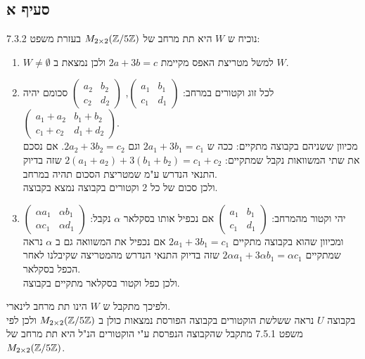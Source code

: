 \documentclass{article}
\begin{document}
	\subsection*{סעיף א}
	נוכיח ש $W$ היא תת מרחב של $M_{2 \times 2}(\mathbb{Z}/5\mathbb{Z})$ בעזרת משפט 7.3.2:
	\begin{enumerate}
		\item $W \neq \emptyset$ למשל מטריצת האפס מקיימת $2a+3b=c$ ולכן נמצאת ב $W$.
		\item לכל זוג וקטורים במרחב: $\begin{pmatrix}
			a_1 & b_1 \\
			c_1 & d_1
		\end{pmatrix}$, $\begin{pmatrix}
			a_2 & b_2 \\
			c_2 & d_2
		\end{pmatrix}$
		סכומם יהיה $\begin{pmatrix}
			a_1 + a_2 & b_1 + b_2 \\
			c_1 + c_2 & d_1 + d_2
		\end{pmatrix}$. \\
		מכיוון ששניהם בקבוצה מתקיים: ככה ש $2a_1+3b_1=c_1$ וגם $2a_2 + 3b_2 = c_2$.
		אם נסכם את שתי המשוואות נקבל שמתקיים: $2(a_1+a_2) + 3(b_1+b_2) = c_1 + c_2$
		שזה בדיוק התנאי הנדרש ע"מ שמטריצת הסכום תהיה במרחב. \\
		ולכן סכום של כל 2 וקטורים בקבוצה נמצא בקבוצה. \\
		\item יהי וקטור מהמרחב: $\begin{pmatrix}
			a_1 & b_1 \\
			c_1 & d_1
		\end{pmatrix}$
		אם נכפיל אותו בסקלאר $\alpha$ נקבל: $\begin{pmatrix}
			\alpha a_1 & \alpha b_1 \\
			\alpha c_1 & \alpha d_1
		\end{pmatrix}$
		ומכיוון שהוא בקבוצה מתקיים $2a_1+3b_1=c_1$ אם נכפיל את המשוואה גם ב $\alpha$ נראה שמתקיים
		$2 \alpha a_1 + 3 \alpha b_1= \alpha c_1$ שזה בדיוק התנאי הנדרש מהמטריצה שקיבלנו לאחר הכפל בסקלאר. \\
		ולכן כפל וקטור בסקלאר מתקיים בקבוצה.
	\end{enumerate}
	ולפיכך מתקבל ש $W$ הינו תת מרחב לינארי. \\
	בקבוצה $U$ נראה ששלשת הוקטורים בקבוצה הפורסת נמצאות כולן ב $M_{2 \times 2}(\mathbb{Z}/5\mathbb{Z})$ ולכן לפי משפט 7.5.1 מתקבל שהקבוצה הנפרסת ע"י הוקטורים הנ"ל היא תת מרחב של $M_{2 \times 2}(\mathbb{Z}/5\mathbb{Z})$.
\end{document}
